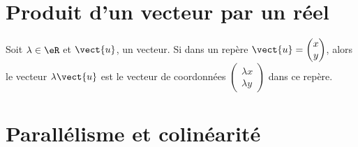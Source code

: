 
\section{Produit d'un vecteur par un réel}

\begin{definition}
    Soit \( \lambda\in \eR\) et \( \vect{ u }\), un vecteur. Si dans un repère \( \vect{ u }=\begin{pmatrix}
        x    \\ 
        y    
    \end{pmatrix}\), alors le vecteur \( \lambda\vect{ u }\) est le vecteur de coordonnées \( \begin{pmatrix}
        \lambda x    \\ 
        \lambda y    
    \end{pmatrix}\) dans ce repère.
\end{definition}


\section{Parallélisme et colinéarité}

